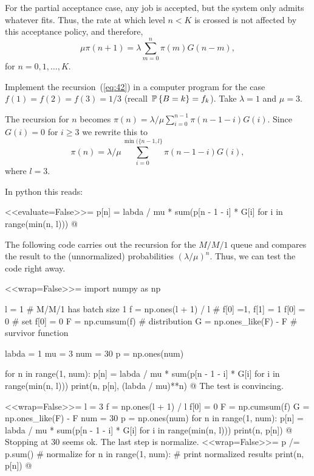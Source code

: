 \begin{question}
\begin{solution}
  For the partial acceptance case, any job is accepted, but the system
  only admits whatever fits. Thus, the rate at which level $n<K$ is
  crossed is not affected by this acceptance policy, and therefore,
  \begin{equation*}
    \mu \pi(n+1) = \lambda \sum_{m=0}^n \pi(m) G(n-m), 
  \end{equation*}
  for $n=0,1,\ldots, K$. 
\end{solution}
\end{question}



\begin{question}
  Implement the recursion~(\ref{eq:42}) in a computer program for the
  case $f(1)=f(2)=f(3)=1/3$ (recall $\P{B=k} =f_k$). Take $\lambda =1$
  and $\mu = 3$.  

  \begin{solution}
The recursion for $n$ becomes $\pi(n) = \lambda/\mu \sum_{i=0}^{n-1} \pi(n-1-i)G(i)$. Since $G(i) =0$ for $i\geq 3$ we rewrite this to 
\begin{equation*}
  \pi(n) = \lambda/\mu \sum_{i=0}^{\min(\{n-1,l\}} \pi(n-1-i)G(i),
\end{equation*}
where $l=3$. 

In python this reads:

<<evaluate=False>>=
p[n] = labda / mu * sum(p[n - 1 - i] * G[i] for i in range(min(n, l)))
@

The following code carries out the recursion for the $M/M/1$ queue and compares the result to the (unnormalized) probabilities $(\lambda/\mu)^n$. Thus, we can test the code right away. 

<<wrap=False>>=
import numpy as np

l = 1 # M/M/1 has batch size 1
f = np.ones(l + 1) / l # f[0] =1, f[1] = 1 
f[0] = 0 # set f[0] = 0
F = np.cumsum(f) # distribution 
G = np.ones_like(F) - F # survivor function

labda = 1
mu = 3
num = 30
p = np.ones(num)

for n in range(1, num):
    p[n] = labda / mu * sum(p[n - 1 - i] * G[i] for i in range(min(n, l)))
    print(n, p[n], (labda / mu)**n)
@
The test is convincing.

<<wrap=False>>=
l = 3
f = np.ones(l + 1) / l
f[0] = 0
F = np.cumsum(f)
G = np.ones_like(F) - F
num = 30
p = np.ones(num)
for n in range(1, num):
    p[n] = labda / mu * sum(p[n - 1 - i] * G[i] for i in range(min(n, l)))
    print(n, p[n])
@
Stopping at 30 seems ok. The last step is normalize.
<<wrap=False>>=
p /= p.sum()  # normalize
for n in range(1, num):  # print normalized results
    print(n, p[n])
@


\end{solution}
\end{question}
